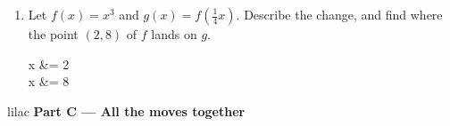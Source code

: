 \documentclass[10pt]{article}
\begin{document}
\begin{enumerate}[leftmargin=1.9em, itemsep=9pt, start=4]
      Graph A:  \hfill
      Graph B:  \hfill
      Graph C: 

\item Let $f(x) = x^3$ and $g(x) = f\!\left(\tfrac{1}{4}x\right)$. Describe the change, and find
      where the point $(2, 8)$ of $f$ lands on $g$.

\begin{work}
  x &= 2 \\
              x &= 8
\end{work}


\end{enumerate}

\newpage

\begin{headlinebox}{lilac}
\textbf{\color{plum}Part C --- All the moves together}
\end{headlinebox}
\end{document}
